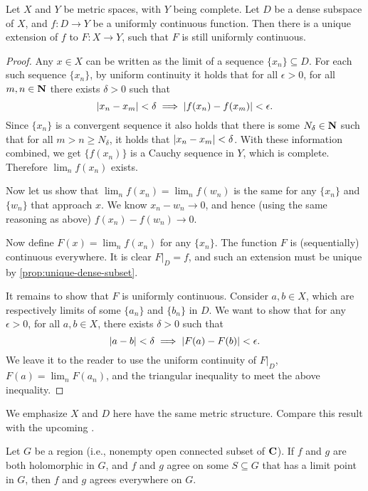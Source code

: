 \begin{thm} \label{thm:ext-unif-cont-func}
    Let $X$ and $Y$ be metric spaces, with $Y$ being complete. Let $D$ be a dense subspace of $X$, and $f\colon D \to Y$ be a uniformly continuous function. Then there is a unique extension of $f$ to $F\colon X \to Y$, such that $F$ is still uniformly continuous.
\end{thm}
\begin{proof}
    Any $x \in X$ can be written as the limit of a sequence $\{x_n\}\subseteq D$. For each such sequence $\{x_n\}$, by uniform continuity it holds that for all $\epsilon > 0$, for all $m,n\in \mathbf{N}$ there exists $\delta > 0$ such that \[
        \lvert x_n - x_m \rvert < \delta \implies \lvert f(x_n) - f(x_m) \rvert < \epsilon.
    \] Since $\{x_n\}$ is a convergent sequence it also holds that there is some $N_\delta \in \mathbf{N}$ such that for all $m > n\geq N_\delta$, it holds that $\lvert x_n - x_m \rvert < \delta$. With these information combined, we get $\{f(x_n)\}$ is a Cauchy sequence in $Y$, which is complete. Therefore $\lim_n f(x_n)$ exists.

    Now let us show that $\lim_n f(x_n) = \lim_n f(w_n)$ is the same for any $\{x_n\}$ and $\{w_n\}$ that approach $x$. We know $x_n - w_n \to 0$, and hence (using the same reasoning as above) $f(x_n) - f(w_n) \to 0$.

    Now define $F(x) = \lim_n f(x_n)$ for any $\{x_n\}$. The function $F$ is (sequentially) continuous everywhere. It is clear $F|_D = f$, and such an extension must be unique by \cref{prop:unique-dense-subset}.

    It remains to show that $F$ is uniformly continuous. Consider $a,b\in X$, which are respectively limits of some $\{a_n\}$ and $\{b_n\}$ in $D$. We want to show that for any $\epsilon > 0$, for all $a,b\in X$, there exists $\delta > 0$ such that \[
        \lvert a - b \rvert < \delta \implies \lvert F(a) - F(b) \rvert < \epsilon.
    \] We leave it to the reader to use the uniform continuity of $F|_D$, $F(a) = \lim_n F(a_n)$, and the triangular inequality to meet the above inequality.
\end{proof}

We emphasize $X$ and $D$ here have the same metric structure. Compare this result with the upcoming .

\begin{namedthm} \label{thm:uniqueness-cplx}
    Let $G$ be a region (i.e., nonempty open connected subset of $\mathbf{C}$). If $f$ and $g$ are both holomorphic in $G$, and $f$ and $g$ agree on some $S \subseteq G$ that has a limit point in $G$, then $f$ and $g$ agrees everywhere on $G$.
\end{namedthm}


